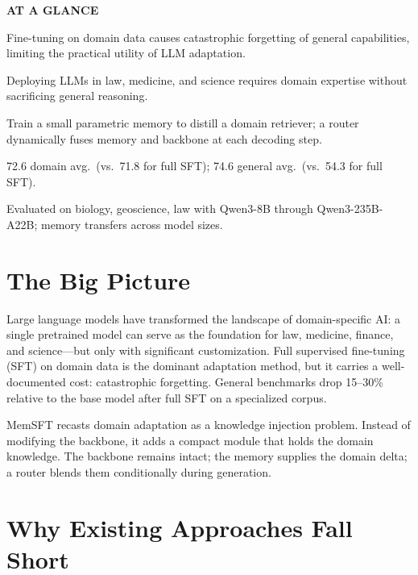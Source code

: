 \documentclass[10pt,twocolumn]{article}
\begin{document}
\begin{mdframed}[backgroundcolor=boxgray,linecolor=rulered,linewidth=1pt,
    innerleftmargin=6pt,innerrightmargin=6pt,
    innertopmargin=6pt,innerbottommargin=6pt]
\textbf{\small AT A GLANCE}\par\vspace{4pt}
\begin{description}[leftmargin=0pt,labelsep=4pt,itemsep=2pt,parsep=0pt,
    font=\small\bfseries]
  \item[Problem:] Fine-tuning on domain data causes catastrophic forgetting
    of general capabilities, limiting the practical utility of LLM adaptation.
  \item[Why it matters:] Deploying LLMs in law, medicine, and science
    requires domain expertise without sacrificing general reasoning.
  \item[Method:] Train a small parametric memory to distill a domain retriever;
    a router dynamically fuses memory and backbone at each decoding step.
  \item[Result:] 72.6 domain avg.\ (vs.\ 71.8 for full SFT);
    74.6 general avg.\ (vs.\ 54.3 for full SFT).
  \item[Evidence:] Evaluated on biology, geoscience, law with Qwen3-8B
    through Qwen3-235B-A22B; memory transfers across model sizes.
\end{description}
\end{mdframed}

\section{The Big Picture}

Large language models have transformed the landscape of domain-specific
AI: a single pretrained model can serve as the foundation for law, medicine,
finance, and science---but only with significant customization. Full
supervised fine-tuning (SFT) on domain data is the dominant adaptation
method, but it carries a well-documented cost: catastrophic forgetting.
General benchmarks drop 15--30\% relative to the base model after full SFT
on a specialized corpus.

MemSFT recasts domain adaptation as a knowledge injection problem. Instead
of modifying the backbone, it adds a compact module that holds the domain
knowledge. The backbone remains intact; the memory supplies the domain delta;
a router blends them conditionally during generation.

\section{Why Existing Approaches Fall Short}
\end{document}
